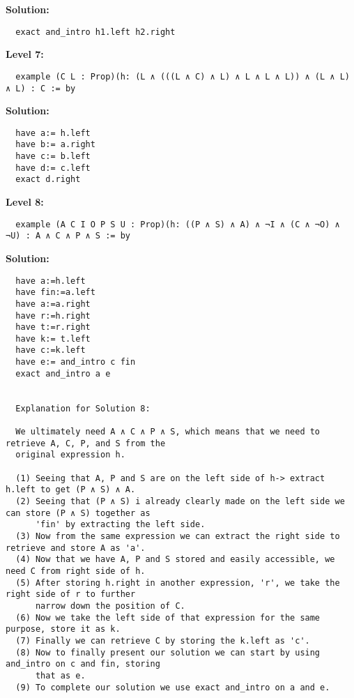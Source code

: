 \documentclass{article}
\theoremstyle{theorem}
\theoremstyle{definition}
\theoremstyle{remark}
\begin{document}
\begin{enumerate}
  \textbf{Solution:}
  \begin{verbatim}
  exact and_intro h1.left h2.right
  \end{verbatim}

  \textbf{Level 7:}
  \begin{verbatim}
  example (C L : Prop)(h: (L ∧ (((L ∧ C) ∧ L) ∧ L ∧ L ∧ L)) ∧ (L ∧ L) ∧ L) : C := by
  \end{verbatim}

  \textbf{Solution:}
  \begin{verbatim}
  have a:= h.left
  have b:= a.right
  have c:= b.left
  have d:= c.left
  exact d.right
  \end{verbatim}

  \textbf{Level 8:}
  \begin{verbatim}
  example (A C I O P S U : Prop)(h: ((P ∧ S) ∧ A) ∧ ¬I ∧ (C ∧ ¬O) ∧ ¬U) : A ∧ C ∧ P ∧ S := by
  \end{verbatim}

  \textbf{Solution:}
  \begin{verbatim}
  have a:=h.left
  have fin:=a.left
  have a:=a.right
  have r:=h.right
  have t:=r.right
  have k:= t.left
  have c:=k.left
  have e:= and_intro c fin
  exact and_intro a e
  

  Explanation for Solution 8: 

  We ultimately need A ∧ C ∧ P ∧ S, which means that we need to retrieve A, C, P, and S from the 
  original expression h. 

  (1) Seeing that A, P and S are on the left side of h-> extract h.left to get (P ∧ S) ∧ A.
  (2) Seeing that (P ∧ S) i already clearly made on the left side we can store (P ∧ S) together as 
      'fin' by extracting the left side.
  (3) Now from the same expression we can extract the right side to retrieve and store A as 'a'.
  (4) Now that we have A, P and S stored and easily accessible, we need C from right side of h.
  (5) After storing h.right in another expression, 'r', we take the right side of r to further 
      narrow down the position of C.
  (6) Now we take the left side of that expression for the same purpose, store it as k.
  (7) Finally we can retrieve C by storing the k.left as 'c'.
  (8) Now to finally present our solution we can start by using and_intro on c and fin, storing 
      that as e.
  (9) To complete our solution we use exact and_intro on a and e.


  \end{verbatim}
\end{enumerate}
\end{document}
